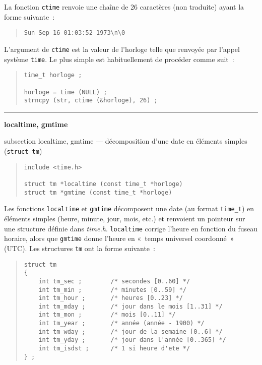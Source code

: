 \documentclass [twoside] {report}
\newcommand {\primitive} [1]
    {
	\phantomsection
	{\large \bf #1}
	\addcontentsline {toc} {subsection} {#1}
    }
\newcommand {\separation}
    {
	\vspace {5mm}
	\nopagebreak
	\hrule
    }
\begin{document}
La fonction {\tt ctime} renvoie une chaîne de 26 caractères
(non traduite) ayant la forme suivante~:
\begin {quote}
\begin {verbatim}
Sun Sep 16 01:03:52 1973\n\0
\end{verbatim}
\end {quote}
L'argument de {\tt ctime} est la valeur de l'horloge telle
que renvoyée par l'appel système {\tt time}. Le plus simple est
habituellement de procéder comme suit~:

\begin {quote}
\begin {verbatim}
time_t horloge ;

horloge = time (NULL) ;
strncpy (str, ctime (&horloge), 26) ;
\end{verbatim}
\end {quote}


\separation
\primitive {localtime, gmtime} --- décomposition d'une date en éléments simples (\texttt {struct tm})

\begin {quote}
\begin {verbatim}
include <time.h>

struct tm *localtime (const time_t *horloge)
struct tm *gmtime (const time_t *horloge)
\end{verbatim}
\end {quote}


Les fonctions {\tt localtime} et {\tt gmtime} décomposent une date (au
format \texttt {time\_t}) en éléments simples (heure, minute, jour,
mois, etc.) et renvoient un pointeur sur une structure définie dans {\em
time.h}.  {\tt localtime} corrige l'heure en fonction du fuseau horaire,
alors que {\tt gmtime} donne l'heure en «~temps universel coordonné~»
(UTC).  Les structures {\tt tm} ont la forme suivante~:
    \label {struct-tm}

\begin {quote}
\begin {verbatim}
struct tm
{
    int tm_sec ;        /* secondes [0..60] */
    int tm_min ;        /* minutes [0..59] */
    int tm_hour ;       /* heures [0..23] */
    int tm_mday ;       /* jour dans le mois [1..31] */
    int tm_mon ;        /* mois [0..11] */
    int tm_year ;       /* année (année - 1900) */
    int tm_wday ;       /* jour de la semaine [0..6] */
    int tm_yday ;       /* jour dans l'année [0..365] */
    int tm_isdst ;      /* 1 si heure d'ete */
} ;
\end{verbatim}
\end {quote}
\end{document}
